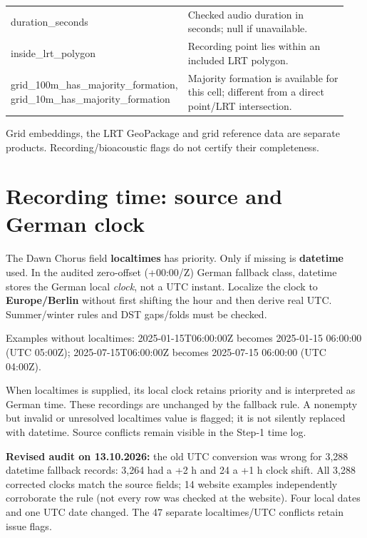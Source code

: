 \documentclass[a4paper,9pt]{extarticle}
\begin{document}
\begin{longtable}{>{\raggedright\arraybackslash}p{0.39\linewidth}>{\raggedright\arraybackslash}p{0.55\linewidth}}
duration\_seconds & Checked audio duration in seconds; null if unavailable. \\

\rowcolor{pale} inside\_lrt\_polygon & Recording point lies within an included LRT polygon. \\

grid\_100m\_has\_majority\_formation, grid\_10m\_has\_majority\_formation & Majority formation is available for this cell; different from a direct point/LRT intersection. \\

\end{longtable}\endgroup

Grid embeddings, the LRT GeoPackage and grid reference data are separate products. Recording/bioacoustic flags do not certify their completeness.\par

\section*{Recording time: source and German clock}

The Dawn Chorus field \textbf{localtimes} has priority. Only if missing is \textbf{datetime} used. In the audited zero-offset (+00:00/Z) German fallback class, datetime stores the German local \emph{clock}, not a UTC instant. Localize the clock to \textbf{Europe/Berlin} without first shifting the hour and then derive real UTC. Summer/winter rules and DST gaps/folds must be checked.\par

Examples without localtimes: 2025-01-15T06:00:00Z becomes 2025-01-15 06:00:00 (UTC 05:00Z); 2025-07-15T06:00:00Z becomes 2025-07-15 06:00:00 (UTC 04:00Z).\par

When localtimes is supplied, its local clock retains priority and is interpreted as German time. These recordings are unchanged by the fallback rule. A nonempty but invalid or unresolved localtimes value is flagged; it is not silently replaced with datetime. Source conflicts remain visible in the Step-1 time log.\par

\textbf{Revised audit on 13.10.2026:} the old UTC conversion was wrong for 3,288 datetime fallback records: 3,264 had a +2 h and 24 a +1 h clock shift. All 3,288 corrected clocks match the source fields; 14 website examples independently corroborate the rule (not every row was checked at the website). Four local dates and one UTC date changed. The 47 separate localtimes/UTC conflicts retain issue flags.\par
\end{document}
